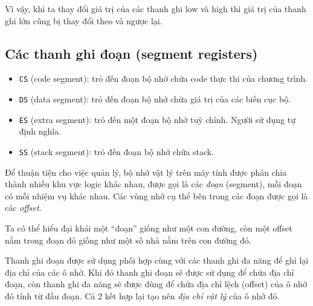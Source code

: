 \documentclass[12pt]{report}
\newcommand{\code}[1]{\texttt{#1}}
\begin{document}
Vì vậy, khi ta thay đổi giá trị của các thanh ghi low và high thì giá trị của thanh ghi lớn cũng bị thay đổi theo và ngược lại.

\subsection*{Các thanh ghi đoạn (segment registers)}
\begin{itemize}
    \item \code{CS} (code segment): trỏ đến đoạn bộ nhớ chứa code thực thi của chương trình.
    \item \code{DS} (data segment): trỏ đến đoạn bộ nhớ chứa giá trị của các biến cục bộ.
    \item \code{ES} (extra segment): trỏ đến một đoạn bộ nhớ tuỳ chỉnh. Người sử dụng tự định nghĩa.
    \item \code{SS} (stack segment): trỏ đến đoạn bộ nhớ chứa stack.
\end{itemize}

Để thuận tiện cho việc quản lý, bộ nhớ vật lý trên máy tính được phân chia thành nhiều khu vực logic khác nhau, được gọi là các \textit{đoạn} (segment), mỗi đoạn có mỗi nhiệm vụ khác nhau. Các vùng nhớ cụ thể bên trong các đoạn được gọi là các \textit{offset}.

Ta có thể hiểu đại khái một ``đoạn'' giống như một con đường, còn một offset nằm trong đoạn đó giống như một số nhà nằm trên con đường đó.

Thanh ghi đoạn được sử dụng phối hợp cùng với các thanh ghi đa năng để ghi lại địa chỉ của các ô nhớ. Khi đó thanh ghi đoạn sẽ được sử dụng để chứa địa chỉ đoạn, còn thanh ghi đa năng sẽ được dùng để chứa địa chỉ lệch (offset) của ô nhớ đó tính từ đầu đoạn. Cả 2 kết hợp lại tạo nên \textit{địa chỉ vật lý} của ô nhớ đó.

\begin{figure}[H]
    \centering
\end{figure}
\end{document}
